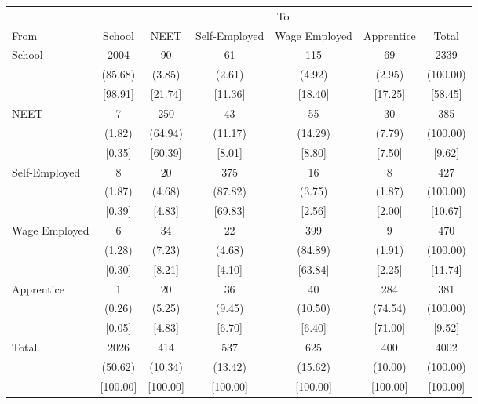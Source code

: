 {
\def\sym#1{\ifmmode^{#1}\else\(^{#1}\)\fi}
\begin{tabular}{l*{6}{c}}
\hline\hline
            &\multicolumn{6}{c}{To}                                                       \\
From        &      School&        NEET&Self-Employed&Wage Employed&  Apprentice&       Total\\
\hline
School      &        2004&          90&          61&         115&          69&        2339\\
            &     (85.68)&      (3.85)&      (2.61)&      (4.92)&      (2.95)&    (100.00)\\
            &     [98.91]&     [21.74]&     [11.36]&     [18.40]&     [17.25]&     [58.45]\\
NEET        &           7&         250&          43&          55&          30&         385\\
            &      (1.82)&     (64.94)&     (11.17)&     (14.29)&      (7.79)&    (100.00)\\
            &      [0.35]&     [60.39]&      [8.01]&      [8.80]&      [7.50]&      [9.62]\\
Self-Employed&           8&          20&         375&          16&           8&         427\\
            &      (1.87)&      (4.68)&     (87.82)&      (3.75)&      (1.87)&    (100.00)\\
            &      [0.39]&      [4.83]&     [69.83]&      [2.56]&      [2.00]&     [10.67]\\
Wage Employed&           6&          34&          22&         399&           9&         470\\
            &      (1.28)&      (7.23)&      (4.68)&     (84.89)&      (1.91)&    (100.00)\\
            &      [0.30]&      [8.21]&      [4.10]&     [63.84]&      [2.25]&     [11.74]\\
Apprentice  &           1&          20&          36&          40&         284&         381\\
            &      (0.26)&      (5.25)&      (9.45)&     (10.50)&     (74.54)&    (100.00)\\
            &      [0.05]&      [4.83]&      [6.70]&      [6.40]&     [71.00]&      [9.52]\\
Total       &        2026&         414&         537&         625&         400&        4002\\
            &     (50.62)&     (10.34)&     (13.42)&     (15.62)&     (10.00)&    (100.00)\\
            &    [100.00]&    [100.00]&    [100.00]&    [100.00]&    [100.00]&    [100.00]\\
\hline\hline
\end{tabular}
}
